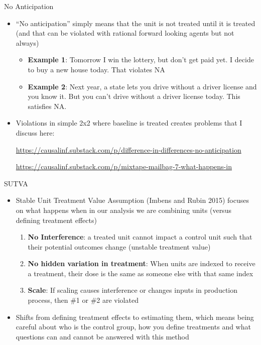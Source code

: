 \documentclass{beamer}
\begin{document}
\begin{frame}{No Anticipation}

\begin{itemize}
\item ``No anticipation'' simply means that the unit is not treated until it is treated (and that can be violated with rational forward looking agents but not always)
	\begin{itemize}
	\item \textbf{Example 1}: Tomorrow I win the lottery, but don't get paid yet. I decide to buy a new house today. That violates NA
	\item \textbf{Example 2}: Next year, a state lets you drive without a driver license and you know it. But you can't drive without a driver license today.  This satisfies NA.
	\end{itemize}
\item Violations in simple 2x2 where baseline is treated creates problems that I discuss here: \bigskip

 \url{https://causalinf.substack.com/p/difference-in-differences-no-anticipation}
 
 \bigskip
 
 \url{https://causalinf.substack.com/p/mixtape-mailbag-7-what-happens-in}
\end{itemize}

\end{frame}





\begin{frame}{SUTVA}

\begin{itemize}
\item Stable Unit Treatment Value Assumption (Imbens and Rubin 2015) focuses on what happens when in our analysis we are combining units (versus defining treatment effects)
	\begin{enumerate}
	\item \textbf{No Interference}: a treated unit cannot impact a control unit such that their potential outcomes change (unstable treatment value)
	\item \textbf{No hidden variation in treatment}: When units are indexed to receive a treatment, their dose is the same as someone else with that same index
	\item \textbf{Scale}: If scaling causes interference or changes inputs in production process, then \#1 or \#2 are violated
	\end{enumerate}
\item Shifts from defining treatment effects to estimating them, which means being careful about who is the control group, how you define treatments and what questions can and cannot be answered with this method
\end{itemize}

\end{frame}
\end{document}
